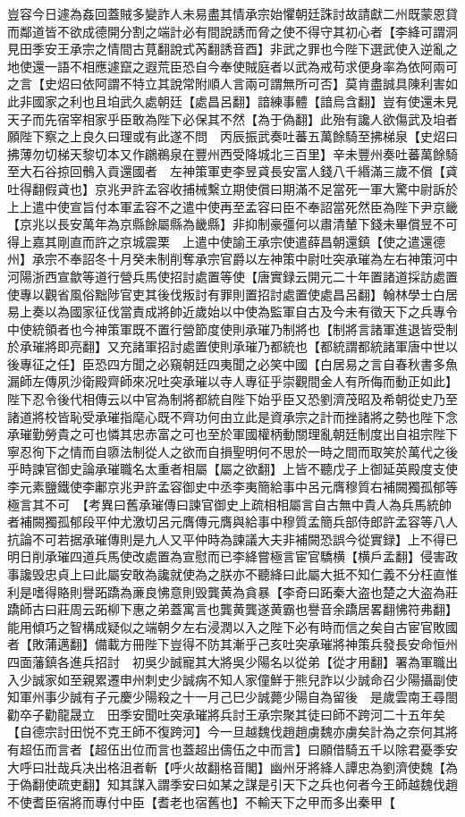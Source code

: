 豈容今日遽為姦回蓋賊多變詐人未易盡其情承宗始懼朝廷誅討故請獻二州既蒙恩貸而鄰道皆不欲成德開分割之端計必有間說誘而脅之使不得守其初心者【李絳可謂洞見田季安王承宗之情間古莧翻說式芮翻誘音酉】非武之罪也今陛下選武使入逆亂之地使還一語不相應遽竄之遐荒臣恐自今奉使賊庭者以武為戒苟求便身率為依阿兩可之言【史炤曰依阿謂不特立其說常附順人言兩可謂無所可否】莫肯盡誠具陳利害如此非國家之利也且垍武久處朝廷【處昌呂翻】諳練事體【諳烏含翻】豈有使還未見天子而先宿宰相家乎臣敢為陛下必保其不然【為于偽翻】此殆有讒人欲傷武及垍者願陛下察之上良久曰理或有此遂不問　丙辰振武奏吐蕃五萬餘騎至拂梯泉【史炤曰拂薄勿切梯天黎切本又作鸊鵜泉在豐州西受降城北三百里】辛未豐州奏吐蕃萬餘騎至大石谷掠回鶻入貢還國者　左神策軍吏李昱貣長安富人錢八千緡滿三歲不償【貣吐得翻假貣也】京兆尹許孟容收捕械繫立期使償曰期滿不足當死一軍大驚中尉訴於上上遣中使宣旨付本軍孟容不之遣中使再至孟容曰臣不奉詔當死然臣為陛下尹京畿【京兆以長安萬年為京縣餘屬縣為畿縣】非抑制豪彊何以肅清輦下錢未畢償昱不可得上嘉其剛直而許之京城震栗　上遣中使諭王承宗使遣薛昌朝還鎮【使之遣還德州】承宗不奉詔冬十月癸未制削奪承宗官爵以左神策中尉吐突承璀為左右神策河中河陽浙西宣歙等道行營兵馬使招討處置等使【唐實録云開元二十年置諸道採訪處置使專以觀省風俗黜陟官吏其後伐叛討有罪則置招討處置使處昌呂翻】翰林學士白居易上奏以為國家征伐當責成將帥近歲始以中使為監軍自古及今未有徵天下之兵專令中使統領者也今神策軍既不置行營節度使則承璀乃制將也【制將言諸軍進退皆受制於承璀將即亮翻】又充諸軍招討處置使則承璀乃都統也【都統謂都統諸軍唐中世以後專征之任】臣恐四方聞之必窺朝廷四夷聞之必笑中國【白居易之言自春秋書多魚漏師左傳夙沙衛殿齊師來况吐突承璀以寺人專征乎崇觀間金人有所侮而動正如此】陛下忍令後代相傳云以中官為制將都統自陛下始乎臣又恐劉濟茂昭及希朝從史乃至諸道將校皆恥受承璀指麾心既不齊功何由立此是資承宗之計而挫諸將之勢也陛下念承璀勤勞貴之可也憐其忠赤富之可也至於軍國權柄動關理亂朝廷制度出自祖宗陛下寧忍徇下之情而自隳法制從人之欲而自損聖明何不思於一時之間而取笑於萬代之後乎時諫官御史論承璀職名太重者相屬【屬之欲翻】上皆不聽戊子上御延英殿度支使李元素鹽鐵使李鄘京兆尹許孟容御史中丞李夷簡給事中呂元膺穆質右補闕獨孤郁等極言其不可　【考異曰舊承璀傳曰諫官御史上疏相相屬言自古無中貴人為兵馬統帥者補闕獨孤郁段平仲尤激切呂元膺傳元膺與給事中穆質孟簡兵部侍郎許孟容等八人抗論不可若据承璀傳則是九人又平仲時為諫議大夫非補闕恐誤今從實録】上不得已明日削承璀四道兵馬使改處置為宣慰而已李絳嘗極言宦官驕横【横戶孟翻】侵害政事讒毁忠貞上曰此屬安敢為讒就使為之朕亦不聽絳曰此屬大抵不知仁義不分枉直惟利是嗜得賂則譽跖蹻為亷良怫意則毁龔黄為貪暴【李奇曰跖秦大盗也楚之大盗為莊蹻師古曰莊周云跖柳下惠之弟蓋寓言也龔黄龔遂黄霸也譽音余蹻居畧翻怫符弗翻】能用傾巧之智構成疑似之端朝夕左右浸潤以入之陛下必有時而信之矣自古宦官敗國者【敗蒲邁翻】備載方冊陛下豈得不防其漸乎己亥吐突承璀將神策兵發長安命恒州四面藩鎮各進兵招討　初吳少誠寵其大將吳少陽名以從弟【從才用翻】署為軍職出入少誠家如至親累遷申州刺史少誠病不知人家僮鮮于熊兒詐以少誠命召少陽攝副使知軍州事少誠有子元慶少陽殺之十一月己巳少誠薨少陽自為留後　是歲雲南王尋閤勸卒子勸龍晟立　田季安聞吐突承璀將兵討王承宗聚其徒曰師不跨河二十五年矣【自德宗討田悦不克王師不復跨河】今一旦越魏伐趙趙虜魏亦虜矣計為之奈何其將有超伍而言者【超伍出位而言也蓋超出儔伍之中而言】曰願借騎五千以除君憂季安大呼曰壯哉兵决出格沮者斬【呼火故翻格音閣】幽州牙將絳人譚忠為劉濟使魏【為于偽翻使疏吏翻】知其謀入謂季安曰如某之謀是引天下之兵也何者今王師越魏伐趙不使耆臣宿將而專付中臣【耆老也宿舊也】不輸天下之甲而多出秦甲【